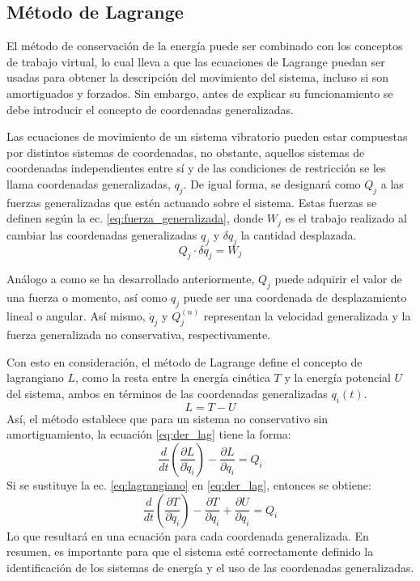 \subsection{Método de Lagrange}
\label{sec:metodo_energia}
El método de conservación de la energía puede ser combinado con los conceptos de trabajo virtual, lo cual lleva a que las ecuaciones de Lagrange puedan ser usadas para obtener la descripción del movimiento del sistema, incluso si son amortiguados y forzados. Sin embargo, antes de explicar su funcionamiento se debe introducir el concepto de coordenadas generalizadas.

Las ecuaciones de movimiento de un sistema vibratorio pueden estar compuestas por distintos sistemas de coordenadas, no obstante, aquellos sistemas de coordenadas independientes entre sí y de las condiciones de restricción se les llama coordenadas generalizadas, $q_j$. De igual forma, se designará como $Q_j$ a las fuerzas generalizadas que estén actuando sobre el sistema. Estas fuerzas se definen según la ec. \ref{eq:fuerza_generalizada}, donde $W_j$ es el trabajo realizado al cambiar las coordenadas generalizadas $q_j$ y $\delta q_j$ la cantidad desplazada. 
\begin{equation}\label{eq:fuerza_generalizada}
	Q_j \cdot \delta q_j = W_j
\end{equation} 

Análogo a como se ha desarrollado anteriormente, $Q_j$ puede adquirir el valor de una fuerza o momento, así como $q_j$ puede ser una coordenada de desplazamiento lineal o angular. Así mismo, $\dot{q}_j$ y $Q_j^{(n)}$ representan la velocidad generalizada y la fuerza generalizada no conservativa, respectivamente.

Con esto en consideración, el método de Lagrange define el concepto de lagrangiano $L$, como la resta entre la energía cinética $T$ y la energía potencial $U$ del sistema, ambos en términos de las coordenadas generalizadas $q_i(t)$.
\begin{equation}\label{eq:lagrangiano}
	L = T - U
\end{equation} 
Así, el método establece que para un sistema no conservativo sin amortiguamiento, la ecuación \ref{eq:der_lag} tiene la forma:
\begin{equation}\label{eq:der_lag}
	\frac{d}{dt}\left(\frac{\partial L}{\partial \dot{q}_i}\right) - \frac{\partial L}{\partial q_i} = Q_i
\end{equation}
Si se sustituye la ec. \ref{eq:lagrangiano} en \ref{eq:der_lag}, entonces se obtiene:
\begin{equation}\label{eq:der_lagconsv}
	\frac{d}{dt}\left(\frac{\partial T}{\partial \dot{q}_i}\right) - \frac{\partial T}{\partial q_i} + \frac{\partial U}{\partial q_i} = Q_i
\end{equation}
Lo que resultará en una ecuación para cada coordenada generalizada. En resumen, es importante para que el sistema esté correctamente definido la identificación de los sistemas de energía y el uso de las coordenadas generalizadas. 


